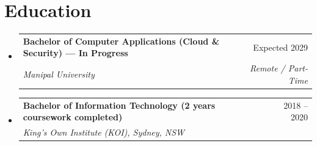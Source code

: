 \documentclass[letterpaper,11pt]{article}
\makeatletter
\newcommand{\resumeSubheading}[4]{
  \vspace{-2pt}\item
    \begin{tabular*}{0.97\textwidth}[t]{l@{\extracolsep{\fill}}r}
      \textbf{#1} & #2 \\
      \textit{\small#3} & \textit{\small #4} \\
    \end{tabular*}\vspace{-7pt}
}
\newcommand{\resumeSubHeadingListStart}{\begin{itemize}[leftmargin=0.15in, label={}]}
\newcommand{\resumeSubHeadingListEnd}{\end{itemize}}
\makeatother
\begin{document}
\section{Education}
  \resumeSubHeadingListStart
    \resumeSubheading
      {Bachelor of Computer Applications (Cloud \& Security) --- In Progress}{Expected 2029}
      {Manipal University}{Remote / Part-Time}
    \resumeSubheading
      {Bachelor of Information Technology (2 years coursework completed)}{2018 -- 2020}
      {King's Own Institute (KOI), Sydney, NSW}{}
  \resumeSubHeadingListEnd

\end{document}

